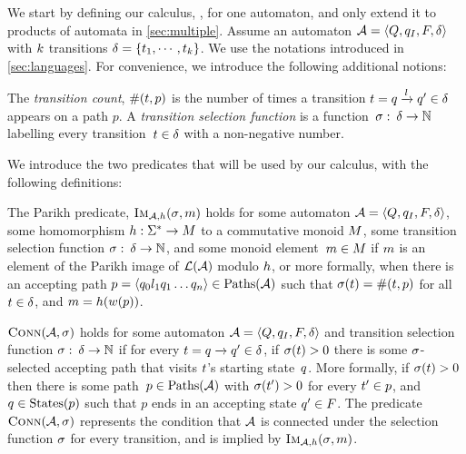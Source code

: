 We start by defining our calculus, \Calculus{}, for one automaton, and only
extend it to products of automata in \cref{sec:multiple}.
%
Assume an automaton $\mathcal{A} = \left\langle Q, q_I, F, \delta\right\rangle$ with $k$
transitions $\delta =
\left\{t_{1} , \cdots , t_{k}\right\}$. We use
the notations introduced in \cref{sec:languages}. For convenience, we
introduce the following additional notions:

\begin{definition}
  The \textit{transition count},
  $\operatorname{\#}(t, p)$ is the number of times a
  transition
  $t = q \xrightarrow{l} q' \in
  \delta$ appears on a path $p$. A \emph{transition selection
    function} is a function~$\operatorname{\sigma}:\: \delta \to \mathbb{N}$
  labelling every transition~$t \in \delta$ with a
  non-negative number.
\end{definition}

We introduce the two predicates that will be used by our calculus,
with the following definitions:
%
\begin{definition}\label{def:single-image}
  The Parikh predicate, $\operatorname{\textsc{Im}}_{\mathcal{A}, h}(\operatorname{\sigma}, m)$ holds for some
  automaton $\mathcal{A} = \left\langle Q, q_I, F, \delta\right\rangle$, some homomorphism
  $h : \Sigma^* \to M$ to a commutative monoid $M$,
  some transition selection function
  $\operatorname{\sigma}:\: \delta \to \mathbb{N}$, and some monoid
  element~$m \in M$ if $m$ is an
  element of the Parikh image of $\operatorname{\mathcal{L}}(\mathcal{A})$ modulo
  $h$, or more formally, when there is an accepting path
  $p = \left\langle q_0 l_1 q_1 \ldots q_n\right\rangle \in \operatorname{Paths}(\mathcal{A})$ such
  that $\operatorname{\sigma}(t) = \operatorname{\#}(t, p)$
  for all $t \in \delta$, and
  $m = h(w(p))$.
\end{definition}

\begin{definition}\label{def:connected} $\operatorname{\textsc{Conn}}(\mathcal{A}, \operatorname{\sigma})$
  holds for some automaton $\mathcal{A} = \left\langle Q, q_I, F, \delta\right\rangle$ and
  transition selection function
  $\operatorname{\sigma}:\: \delta \to \mathbb{N}$
  if for every
  $t = q \xrightarrow{} q' \in \delta$,
  if $\operatorname{\sigma}(t) > 0$ there is some $\operatorname{\sigma}$-selected
  accepting path that visits $t$'s starting state~$q$. More formally,
  if $\operatorname{\sigma}(t) > 0$ then there is some
  path~$p \in \operatorname{Paths}(\mathcal{A})$ with
  $\operatorname{\sigma}(t') > 0$ for every $t' \in p$, and $q \in
  \operatorname{States}(p)$ such that $p$ ends in an accepting state $q' \in F$. The predicate~$\operatorname{\textsc{Conn}}(\mathcal{A}, \operatorname{\sigma})$ represents the
  condition that $\mathcal{A}$ is connected under the selection
  function $\operatorname{\sigma}$ for every transition, and is implied by
  $\operatorname{\textsc{Im}}_{\mathcal{A}, h}(\operatorname{\sigma}, m)$.
\end{definition}


